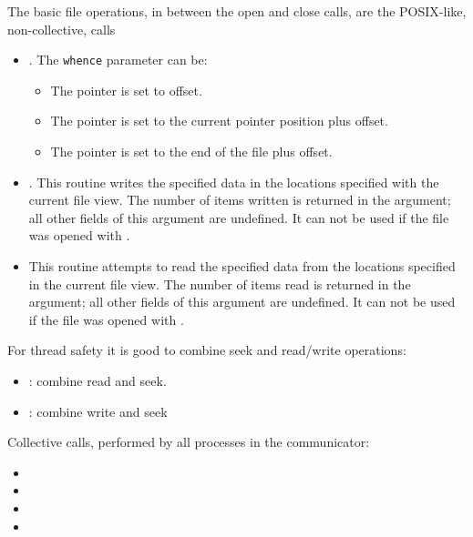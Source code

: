 The basic file operations, in between the open and close calls, are
the POSIX-like, non-collective, calls
\begin{itemize}
\item {}. The \lstinline{whence} parameter can be:
  \begin{itemize}
  \item {} The pointer is set to offset.
  \item {} The pointer is set to the current
    pointer position plus offset.
  \item {} The pointer is set to the end of
    the file plus offset.
  \end{itemize}
\item {}. This routine writes the specified data
  in the locations specified with the current file view. 
  The number of items written is returned in the  argument;
  all other fields of this argument are undefined.
  It can not be used if the file
  was opened with .
\item {} This routine attempts to read the specified data
  from the locations specified in the current file view. 
  The number of items read is returned in the  argument;
  all other fields of this argument are undefined.
  It can not be used if the file
  was opened with .
\end{itemize}

For thread safety it is good to combine seek and read/write operations:
\begin{itemize}
\item {}: combine read and seek.
\item {}: combine write and seek
\end{itemize}

Collective calls, performed by all processes in the communicator:
\begin{itemize}
\item {}
\item {}
\item {}
\item {}
\end{itemize}


